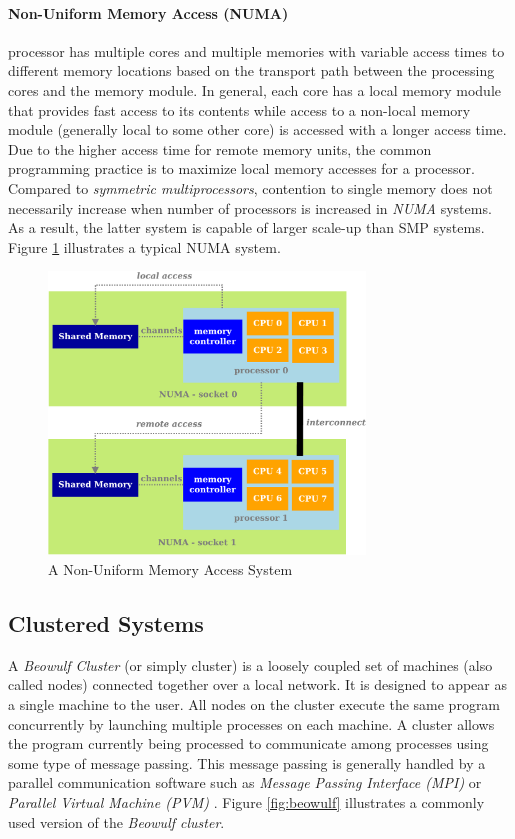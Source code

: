 \documentclass[11pt]{book}
\begin{document}
\paragraph{Non-Uniform Memory Access (NUMA)} processor has multiple cores and multiple memories with variable
access times to different memory locations based on the transport path between the processing cores and the
memory module.  In general, each core has a local memory module that provides fast access to its contents
while access to a non-local memory module (generally local to some other core) is accessed with a longer
access time.  Due to the higher access time for remote memory units, the common programming practice is to
maximize local memory accesses for a processor.  Compared to \emph{symmetric multiprocessors}, contention to
single memory does not necessarily increase when number of processors is increased in \emph{NUMA} systems.  As
a result, the latter system is capable of larger scale-up than SMP systems.  Figure \ref{fig:numa} illustrates
a typical NUMA system.

\begin{figure}
    \centering
    \includegraphics[width=0.75\textwidth]{figures/numa.pdf}
    \caption{A Non-Uniform Memory Access System}\label{fig:numa}
\end{figure}

\subsection{Clustered Systems}\label{subsec:clustered_systems}

A \emph{Beowulf Cluster} (or simply cluster) is a loosely coupled set of machines (also called nodes)
connected together over a local network.  It is designed to appear as a single machine to the user.  All nodes
on the cluster execute the same program concurrently by launching multiple processes on each machine.  A
cluster allows the program currently being processed to communicate among processes using some type of message
passing.  This message passing is generally handled by a parallel communication software such as \emph{Message
  Passing Interface (MPI)} \cite{gropp-94} or \emph{Parallel Virtual Machine (PVM)} \cite{geist-94}.  Figure
\ref{fig:beowulf} illustrates a commonly used version of the \emph{Beowulf cluster}.
\end{document}
